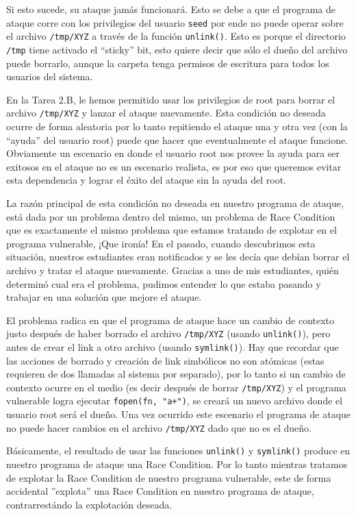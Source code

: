 Si esto sucede, su ataque jamás funcionará. Esto se debe a que el programa de ataque corre con los privilegios del usuario \texttt{seed} por ende no puede operar sobre el archivo \texttt{/tmp/XYZ} a través de la función \texttt{unlink()}.
Esto es porque el directorio \texttt{/tmp} tiene activado el ``sticky'' bit, esto quiere decir que sólo el dueño del archivo puede borrarlo, aunque la carpeta tenga permisos de escritura para todos los usuarios del sistema.

En la Tarea 2.B, le hemos permitido usar los privilegios de root para borrar el archivo \texttt{/tmp/XYZ} y lanzar el ataque nuevamente. Esta condición no deseada ocurre de forma aleatoria por lo tanto repitiendo el ataque una y otra vez (con la ``ayuda'' del usuario root) puede que hacer que eventualmente el ataque funcione. Obviamente un escenario en donde el usuario root nos provee la ayuda para ser exitosos en el ataque no es un escenario realista, es por eso que queremos evitar esta dependencia y lograr el éxito del ataque sin la ayuda del root.

La razón principal de esta condición no deseada en nuestro programa de ataque, está dada por un problema dentro del mismo, un problema de Race Condition que es exactamente el mismo problema que estamos tratando de explotar en el programa vulnerable, ¡Que ironía!
En el pasado, cuando descubrimos esta situación, nuestros estudiantes eran notificados y se les decía que debían borrar el archivo y tratar el ataque nuevamente. Gracias a uno de mis estudiantes, quién determinó cual era el problema, pudimos entender lo que estaba pasando y trabajar en una solución que mejore el ataque.

El problema radica en que el programa de ataque hace un cambio de contexto justo después de haber borrado el archivo {\tt /tmp/XYZ} (usando \texttt{unlink()}), pero antes de crear el link a otro archivo (usando \texttt{symlink()}).
Hay que recordar que las acciones de borrado y creación de link simbólicos no son atómicas (estas requieren de dos llamadas al sistema por separado), por lo tanto si un cambio de contexto ocurre en el medio (es decir después de borrar {\tt /tmp/XYZ}) y el programa vulnerable \setuid logra ejecutar {\tt fopen(fn, "a+")}, se creará un nuevo archivo donde el usuario root será el dueño.
Una vez ocurrido este escenario el programa de ataque no puede hacer cambios en el archivo {\tt /tmp/XYZ} dado que no es el dueño.

Básicamente, el resultado de usar las funciones \texttt{unlink()} y \texttt{symlink()} produce en nuestro programa de ataque una Race Condition. Por lo tanto mientras tratamos de explotar la Race Condition de nuestro programa vulnerable, este de forma accidental ''explota'' una Race Condition en nuestro programa de ataque, contrarrestándo la explotación deseada.

